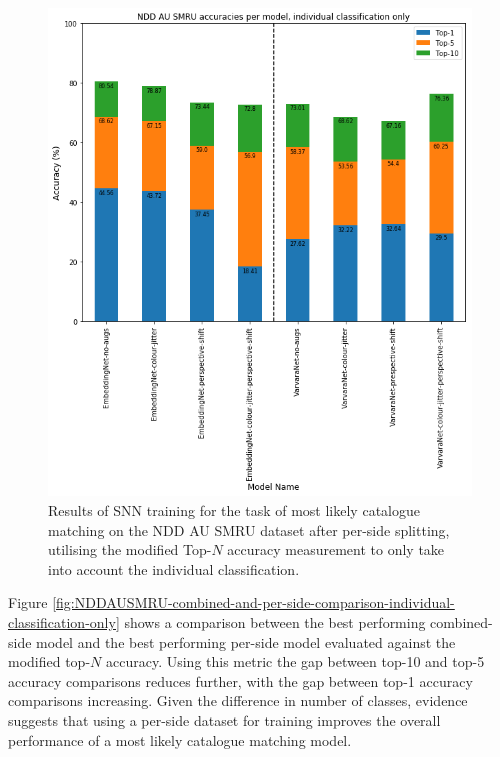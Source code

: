 \begin{figure}
	\begin{center}
		\includegraphics[scale=0.5]{Chapter5/figs/NDDAUSMRU-per-side-individual-classification-only-SNN-model-accuracies.png}
	\end{center}
	\caption{Results of SNN training for the task of most likely catalogue matching on the NDD AU SMRU dataset after per-side splitting, utilising the modified Top-$N$ accuracy measurement to only take into account the individual classification.}
	\label{fig:NDDAUSMRU-per-side-individual-classification-only-SNN-model-accuracies}
\end{figure}

Figure \ref{fig:NDDAUSMRU-combined-and-per-side-comparison-individual-classification-only} shows a comparison between the best performing combined-side model and the best performing per-side model evaluated against the modified top-$N$ accuracy. Using this metric the gap between top-10 and top-5 accuracy comparisons reduces further, with the gap between top-1 accuracy comparisons increasing. Given the difference in number of classes, evidence suggests that using a per-side dataset for training improves the overall performance of a most likely catalogue matching model. 

